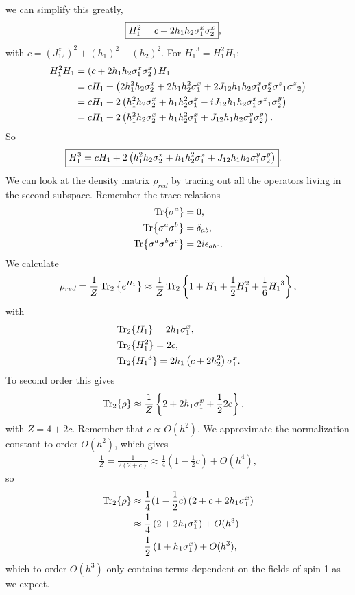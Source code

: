 we can simplify this greatly,
\begin{align*}
    \Aboxed{H_1^2 & = c + 2 h_1 h_2 {\sx_1} {\sx_2}},
\end{align*}
with $c= \left(J^{z}_{12}\right)^{2}+  \left(h_1\right)^{2} + \left(h_2\right)^{2}$. For ${H_1}^3=H_1^2 {H_1}$:
\begin{align*}
    H_1^2 {H_1} & = \left(c + 2 h_1 h_2 {\sigma^{x}_1} {\sigma^{x}_2}\right) {H_1} \\
    & = c {H_1} + \left(2 h_1^2 h_2 {\sigma^{x}_2} + 2  h_1h_2^2 {\sigma^{x}_1} + 2 J_{12} h_1 h_2 {\sigma^{x}_1} {\sigma^{x}_2}{\sigma^{z}}_1 {\sigma^{z}}_2\right)\\
    & = c {H_1} + 2 \left(h_1^2 h_2 {\sigma^{x}_2} +  h_1h_2^2 {\sigma^{x}_1} - iJ_{12} h_1 h_2 {\sigma^{x}_1}{\sigma^{z}}_1 {\sigma^{y}_2}\right)\\
    & = c {H_1} + 2 \left(h_1^2 h_2 {\sigma^{x}_2} +  h_1h_2^2 {\sigma^{x}_1} + J_{12} h_1 h_2 {\sigma^{y}_1} {\sigma^{y}_2}\right).
\end{align*}
So 
\begin{align*}
    \Aboxed{H_1^3 = c {H_1} + 2 \left(h_1^2 h_2 {\sx_2} +  h_1h_2^2 {\sx_1} + J_{12} h_1 h_2 {\sy_1} {\sy_2}\right)}.
\end{align*}
We can look at the density matrix $\rho_{red}$ by tracing out all the operators living in the second subspace. Remember the trace relations
\begin{align}
    \Tr{\sigma^a} &= 0,\\
    \Tr{\sigma^a\sigma^b} &= \delta_{ab},\\
    \Tr{\sigma^a\sigma^b\sigma^c} &= 2i \epsilon_{abc}.
\end{align}
We calculate
\begin{align*}
    \rho_{red} = \frac{1}{Z} \Tr_2 \left\{ e^{H_1}\right\} \approx \frac{1}{Z} \Tr_2 \left\{1 + {H_1} + \frac{1}{2}H_1^2 + \frac{1}{6} {H_1}^3\right\},
\end{align*}
with
\begin{align*}
    &\Tr_2\{{H_1}\} = 2 h_1 {\sigma^{x}_1},\\
    &\Tr_2\{H_1^2\} = 2c ,\\
    &\Tr_2\{{H_1}^3\} = 2h_1 \left(c  + 2 h_2^2 \right){\sigma^{x}_1}.
\end{align*}
To second order this gives
\begin{align*}
    \Tr_2\{\rho\} & \approx \frac{1}{Z} \left\{2 + 2 h_1 {\sigma^{x}_1} + \frac{1}{2} 2c\right\},
\end{align*}
with $Z = 4 + 2c$. Remember that $c \propto O(h^2)$. We  approximate the normalization constant to order $O(h^2)$, which gives
\begin{align*}
    \frac{1}{Z} = \frac{1}{2(2+c)} \approx \frac{1}{4}(1 - \frac{1}{2}c) + O(h^4),
\end{align*}
so
\begin{align*}
    \Tr_2\{\rho\} & \approx\frac{1}{4}(1 - \frac{1}{2}c)\left(2 + c + 2 h_1 {\sigma^{x}_1}  \right) \\
     & \approx \frac{1}{4}\left(2 + 2 h_1 {\sigma^{x}_1} \right) + O(h^3) \\
     & = \frac{1}{2}\left(1 + h_1 {\sigma^{x}_1} \right) + O(h^3),
\end{align*}
which to order $O(h^3)$ only contains terms dependent on the fields of spin 1 as we expect.\newline

